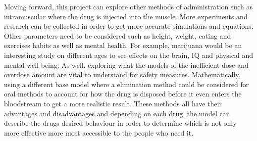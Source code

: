 \documentclass{article}
\begin{document}
Moving forward, this project can explore other methods of administration such as intramuscular where the drug is injected into the muscle. More experiments and research can be collected in order to get more accurate simulations and equations. Other parameters need to be considered such as height, weight, eating and exercises habits as well as mental health. For example, marijuana would be an interesting study on different ages to see effects on the brain, IQ and physical and mental well being. As well, exploring what the models of the inefficient dose and overdose amount are vital to understand for safety measures. Mathematically, using a different base model where a elimination method could be considered for oral methods to account for how the drug is disposed before it even enters the bloodstream to get a more realistic result. These methods all have their advantages and disadvantages and depending on each drug, the model can describe the drugs desired behaviour in order to determine which is not only more effective more most accessible to the people who need it. 
\end{document}
